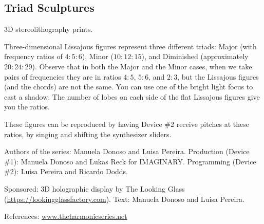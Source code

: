 \subsection{Triad Sculptures}
3D stereolithography prints.

Three-dimensional Lissajous figures represent three different triads: Major (with frequency ratios of $4:5:6$), Minor ($10:12:15$), and Diminished (approximately $20:24:29$). Observe that in both the Major and the Minor cases, when we take pairs of frequencies they are in ratios $4:5$, $5:6$, and $2:3$, but the Lissajous figures (and the chords) are not the same. You can use one of the bright light focus to cast a shadow. The number of lobes on each side of the flat Lissajous figures give you the ratios.

These figures can be reproduced by having Device \#2 receive pitches at these ratios, by singing and shifting the synthesizer sliders.

\vfill

Authors of the series: Manuela Donoso and Luisa Pereira.
Production (Device \#1): Manuela Donoso and Lukas Reck for IMAGINARY.
Programming (Device \#2): Luisa Pereira and Ricardo Dodds.

Sponsored: 3D holographic display by The Looking Glass (\url{https://lookingglassfactory.com}).
Text: Manuela Donoso and Luisa Pereira.

References: \url{www.theharmonicseries.net}

